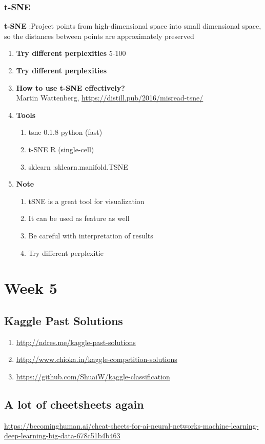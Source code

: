 \documentclass[11pt, twoside]{article}   	%
\begin{document}
\subsubsection{t-SNE}
\textbf{t-SNE} :Project points from high-dimensional space into small dimensional space, so the distances between points are approximately preserved 
\begin{enumerate}

    \item \textbf{Try different perplexities} 5-100
    \item \textbf{Try different perplexities}
    \item  \textbf{How to use t-SNE effectively?}
   \\Martin Wattenberg, \url{https://distill.pub/2016/misread-tsne/}
     \item \textbf{Tools}
         \begin{enumerate}
        \item tsne 0.1.8 python (fast)
        \item t-SNE R (single-cell)
         \item sklearn :sklearn.manifold.TSNE
          \end{enumerate}
       \item \textbf{Note}
     \begin{enumerate}
        \item tSNE is a great tool for visualization
        \item It can be used as feature as well
        \item Be careful with interpretation of results
        \item Try different perplexitie
       \end{enumerate}

 
  \end{enumerate}

\pagebreak
\section{Week 5}
\subsection{Kaggle Past Solutions}
\begin{enumerate}
    \item \url{http://ndres.me/kaggle-past-solutions}
    \item \url{http://www.chioka.in/kaggle-competition-solutions}
    \item \url{https://github.com/ShuaiW/kaggle-classification}
 \end{enumerate}    

\subsection{A lot of cheetsheets again}
\url{https://becominghuman.ai/cheat-sheets-for-ai-neural-networks-machine-learning-deep-learning-big-data-678c51b4b463}
\end{document}
